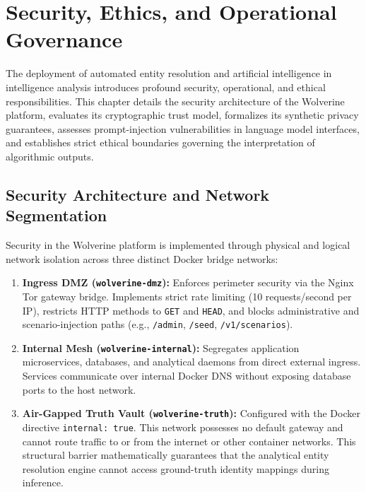 \chapter{Security, Ethics, and Operational Governance}
\label{ch:security-ethics}

The deployment of automated entity resolution and artificial intelligence in intelligence analysis introduces profound security, operational, and ethical responsibilities. This chapter details the security architecture of the Wolverine platform, evaluates its cryptographic trust model, formalizes its synthetic privacy guarantees, assesses prompt-injection vulnerabilities in language model interfaces, and establishes strict ethical boundaries governing the interpretation of algorithmic outputs.

\section{Security Architecture and Network Segmentation}
\label{sec:sec-architecture}
Security in the Wolverine platform is implemented through physical and logical network isolation across three distinct Docker bridge networks:

\begin{enumerate}
    \item \textbf{Ingress DMZ (\texttt{wolverine-dmz}):} Enforces perimeter security via the Nginx Tor gateway bridge. Implements strict rate limiting (10 requests/second per IP), restricts HTTP methods to \texttt{GET} and \texttt{HEAD}, and blocks administrative and scenario-injection paths (e.g., \texttt{/admin}, \texttt{/seed}, \texttt{/v1/scenarios}).
    \item \textbf{Internal Mesh (\texttt{wolverine-internal}):} Segregates application microservices, databases, and analytical daemons from direct external ingress. Services communicate over internal Docker DNS without exposing database ports to the host network.
    \item \textbf{Air-Gapped Truth Vault (\texttt{wolverine-truth}):} Configured with the Docker directive \texttt{internal: true}. This network possesses no default gateway and cannot route traffic to or from the internet or other container networks. This structural barrier mathematically guarantees that the analytical entity resolution engine cannot access ground-truth identity mappings during inference.
\end{enumerate}

